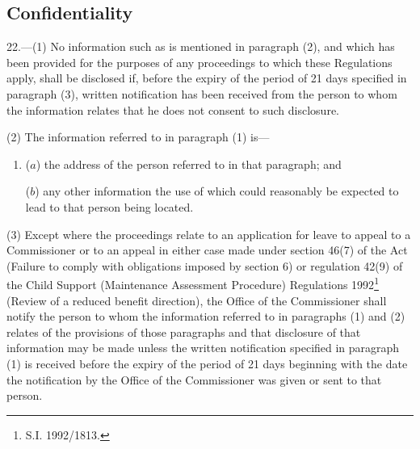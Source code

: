 \documentclass[12pt,a4paper]{article}
\begin{document}
\renewcommand\parthead{--- Part V}

\subsection[22. Confidentiality]{Confidentiality}

%
%

22.—(1) No information such as is mentioned in paragraph (2), and which has been provided for the purposes of any proceedings to which these Regulations apply, shall be disclosed if, before the expiry of the period of 21 days specified in paragraph (3), written notification has been received from the person to whom the information relates that he does not consent to such disclosure.

(2) The information referred to in paragraph (1) is—
\begin{enumerate}\item[]
($a$) the address of the person referred to in that paragraph; and

($b$) any other information the use of which could reasonably be expected to lead to that person being located.
\end{enumerate}

(3) Except where the proceedings relate to an application for leave to appeal to a Commissioner or to an appeal in either case made under section 46(7) of the Act (Failure to comply with obligations imposed by section 6) or regulation 42(9) of the Child Support (Maintenance Assessment Procedure) Regulations 1992\footnote{\frenchspacing S.I. 1992/1813.} (Review of a reduced benefit direction), the Office of the Commissioner shall notify the person to whom the information referred to in paragraphs (1) and (2) relates of the provisions of those paragraphs and that disclosure of that information may be made unless the written notification specified in paragraph (1) is received before the expiry of the period of 21 days beginning with the date the notification by the Office of the Commissioner was given or sent to that person.
\end{document}

